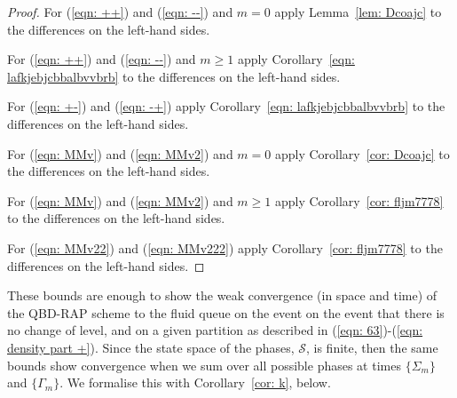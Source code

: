 \begin{proof} 
	For (\ref{eqn: ++}) and (\ref{eqn: --}) and \(m= 0\) apply Lemma~\ref{lem: Dcoajc} to the differences on the left-hand sides.
	
	For (\ref{eqn: ++}) and (\ref{eqn: --}) and \(m\geq 1\) apply Corollary~\ref{eqn: lafkjebjcbbalbvvbrb} to the differences on the left-hand sides.
	
	For (\ref{eqn: +-}) and (\ref{eqn: -+}) apply Corollary~\ref{eqn: lafkjebjcbbalbvvbrb} to the differences on the left-hand sides.
	
	For (\ref{eqn: MMv}) and (\ref{eqn: MMv2}) and \(m= 0\) apply Corollary~\ref{cor: Dcoajc} to the differences on the left-hand sides.
	
	For (\ref{eqn: MMv}) and (\ref{eqn: MMv2}) and \(m\geq 1\) apply Corollary~\ref{cor: fljm7778} to the differences on the left-hand sides.
	
	For (\ref{eqn: MMv22}) and (\ref{eqn: MMv222}) apply Corollary~\ref{cor: fljm7778} to the differences on the left-hand sides.
\end{proof}
These bounds are enough to show the weak convergence (in space and time) of the QBD-RAP scheme to the fluid queue on the event on the event that there is no change of level, and on a given partition as described in (\ref{eqn: 63})-(\ref{eqn: density part +}). Since the state space of the phases, \(\mathcal S\), is finite, then the same bounds show convergence when we sum over all possible phases at times \(\{\Sigma_m\}\) and \(\{\Gamma_m\}\). We formalise this with Corollary~\ref{cor: k}, below.

